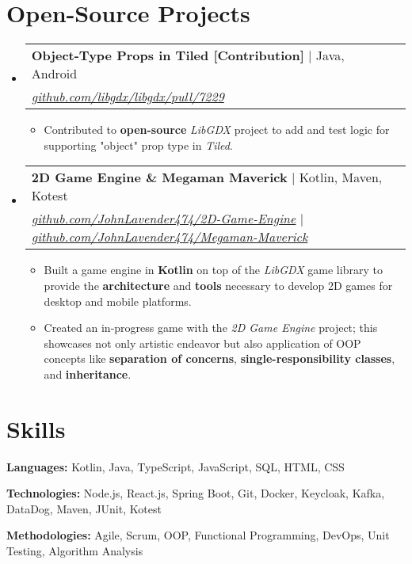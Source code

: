 \documentclass[letterpaper,11pt]{article}
\makeatletter
\newcommand{\resumeItem}[1]{
  \item\small{
    {#1 \vspace{-2pt}}
  }
}
\newcommand{\resumeProjectHeading}[2]{
    \vspace{-2pt}\item
    \begin{tabular*}{0.97\textwidth}{l@{\extracolsep{\fill}}r}
      \small#1 & #2 \\
    \end{tabular*}\vspace{-7pt}
}
\newcommand{\resumeSubHeadingListStart}{\begin{itemize}[leftmargin=0.15in, label={}]}
\newcommand{\resumeSubHeadingListEnd}{\end{itemize}}
\newcommand{\resumeItemListStart}{\begin{itemize}}
\newcommand{\resumeItemListEnd}{\end{itemize}\vspace{-5pt}}
\makeatother
\begin{document}
\section{Open-Source Projects}
    \vspace{3pt}
    \resumeSubHeadingListStart
    
     \resumeProjectHeading
    {\textbf{Object-Type Props in Tiled [Contribution]} $|$ Java, Android \\ \emph{\href{https://github.com/libgdx/libgdx/pull/7229}{\color{blue}github.com/libgdx/libgdx/pull/7229}}}{}
    \resumeItemListStart
    \resumeItem{Contributed to \textbf{open-source} \textit{LibGDX} project to add and test logic for supporting "object" prop type in \textit{Tiled}.}
    \resumeItemListEnd
      
      \resumeProjectHeading
        {\textbf{2D Game Engine \& Megaman Maverick} $|$ Kotlin, Maven, Kotest \\ \emph{\href{https://github.com/JohnLavender474/2D-Game-Engine}{\color{blue}github.com/JohnLavender474/2D-Game-Engine} } $|$
        \emph{\href{https://github.com/JohnLavender474/Megaman-Maverick}{\color{blue}github.com/JohnLavender474/Megaman-Maverick} }}{}
          \resumeItemListStart
            \resumeItem{Built a game engine in \textbf{Kotlin} on top of the \textit{LibGDX} game library to provide the \textbf{architecture} and \textbf{tools} necessary to develop 2D games for desktop and mobile platforms.}
            \resumeItem{Created an in-progress game with the \textit{2D Game Engine} project; this showcases not only artistic endeavor but also application of OOP concepts like \textbf{separation of concerns}, \textbf{single-responsibility classes}, and \textbf{inheritance}.}
          \resumeItemListEnd                                                
      
    \resumeSubHeadingListEnd


\section{Skills}
\vspace{2pt}
\resumeSubHeadingListStart
\small{\item{
		
		\textbf{Languages:}{ Kotlin, Java, TypeScript, JavaScript, SQL, HTML, CSS} \\ \vspace{3pt}
		
		\textbf{Technologies:}{ Node.js, React.js, Spring Boot, Git, Docker, Keycloak, Kafka, DataDog, Maven, JUnit, Kotest} \\ \vspace{3pt}
		
		\textbf{Methodologies:}{ Agile, Scrum, OOP, Functional Programming, DevOps, Unit Testing, Algorithm Analysis} \\ \vspace{3pt}
		
}}
\resumeSubHeadingListEnd
\end{document}
